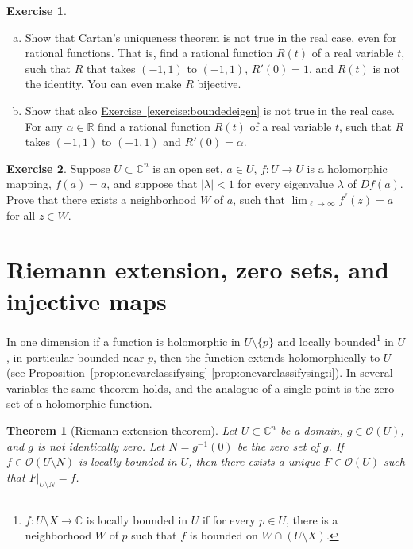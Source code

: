 \documentclass[12pt,openany]{book}
\newcommand{\sabs}[1]{\lvert {#1} \rvert}
\newcommand{\C}{{\mathbb{C}}}
\newcommand{\R}{{\mathbb{R}}}
\newcommand{\sO}{{\mathscr{O}}}
\newcommand{\myindex}[1]{#1\index{#1}}
\theoremstyle{plain}
\newtheorem{thm}{Theorem}[section]
\theoremstyle{remark}
\theoremstyle{definition}
\newenvironment{exbox}{%
    \def\FrameCommand{\vrule width 1pt \relax\hspace{10pt}}%
    \MakeFramed {\advance \hsize -\width \FrameRestore}%
}{%
    \endMakeFramed
}
\newenvironment{exparts}{%
    \leavevmode\begin{enumerate}[a),noitemsep,topsep=0pt,parsep=0pt,partopsep=0pt]
}{%
    \end{enumerate}
}
\theoremstyle{exercise}
\newtheorem{exercise}{Exercise}[section]
\theoremstyle{example}
\newcommand{\exerciseref}[1]{\hyperref[#1]{Exercise~\ref*{#1}}}
\newcommand{\propref}[1]{\hyperref[#1]{Proposition~\ref*{#1}}}
\begin{document}
\begin{exbox}
\begin{exercise}
\begin{exparts}
\item
Show that Cartan's uniqueness theorem is not true in the real case,
even for rational
functions.  That is, find a rational function $R(t)$ of
a real variable $t$, such that $R$ that takes $(-1,1)$ to
$(-1,1)$, $R'(0) = 1$, and $R(t)$ is not the identity.  You can even make
$R$ bijective.
\item
Show that also \exerciseref{exercise:boundedeigen} is not true in the real
case.
For any $\alpha \in \R$ find a rational function $R(t)$ of
a real variable $t$, such that $R$ takes $(-1,1)$ to $(-1,1)$ and
$R'(0) = \alpha$.
\end{exparts}
\end{exercise}

\begin{exercise}
Suppose $U \subset \C^n$ is an open set, $a \in U$,
$f \colon U \to U$ is a holomorphic mapping,
$f(a) = a$, and suppose that $\sabs{\lambda} < 1$
for every eigenvalue $\lambda$ of
$D f(a)$.  Prove that there exists a neighborhood $W$ of $a$, such that
$\lim_{\ell \to \infty} f^{\ell}(z) = a$ for all $z \in W$.
\end{exercise}
\end{exbox}


\section{Riemann extension, zero sets, and injective maps}
\label{sec:riemannextzerosetsinjmaps}

In one dimension if a function is holomorphic in $U
\setminus \{ p \}$ and
locally bounded\footnote{%
$f \colon U \setminus X \to \C$ is locally bounded in $U$
if for every $p \in U$, there is a neighborhood $W$ of
$p$ such that $f$ is bounded on $W \cap (U \setminus X)$.}
in $U$, in particular bounded near
$p$, then the function extends holomorphically to $U$ (see
\propref{prop:onevarclassifysing} \ref{prop:onevarclassifysing:i}).  In several
variables the same theorem holds, and the analogue of a single point
is the zero set of a holomorphic function.

\begin{thm}[\myindex{Riemann extension theorem}]
Let $U \subset \C^n$ be a domain,  $g \in \sO(U)$, and $g$ is not
identically zero.  Let
$N = g^{-1}(0)$ be the zero set of $g$.
If 
$f \in \sO(U \setminus N)$
is locally bounded in $U$,
then there exists a unique $F \in \sO(U)$ such that $F|_{U \setminus N} = f$.
\end{thm}
\end{document}
